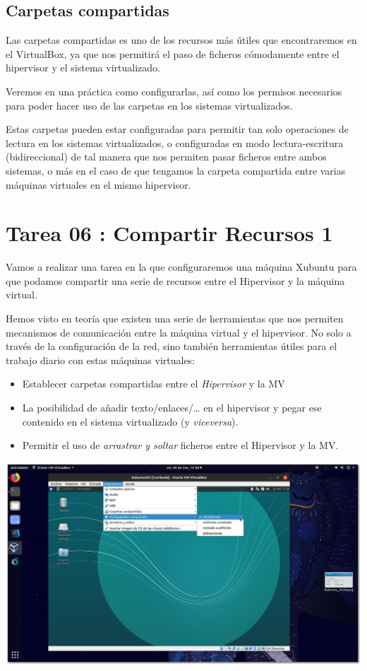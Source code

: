 \documentclass[11pt]{article}
\begin{document}
\subsection{Carpetas compartidas}
\label{sec:org675f63b}
Las carpetas compartidas es uno de los recursos más útiles que
encontraremos en el VirtualBox, ya que nos permitirá el paso de ficheros
cómodamente entre el hipervisor y el sistema virtualizado.

Veremos en una práctica como configurarlas, así como los permisos
necesarios para poder hacer uso de las carpetas en los sistemas
virtualizados.

Estas carpetas pueden estar configuradas para permitir tan solo
operaciones de lectura en los sistemas virtualizados, o configuradas en
modo lectura-escritura (bidireccional) de tal manera que nos permiten
pasar ficheros entre ambos sistemas, o más en el caso de que tengamos la
carpeta compartida entre varias máquinas virtuales en el mismo
hipervisor.


\newpage


\section{Tarea 06 : Compartir Recursos 1}
\label{sec:org173eb11}
Vamos a realizar una tarea en la que configuraremos una máquina Xubuntu
para que podamos compartir una serie de recursos entre el Hipervisor y
la máquina virtual.

Hemos visto en teoría que existen una serie de herramientas que nos
permiten mecanismos de comunicación entre la máquina virtual y el
hipervisor. No solo a través de la configuración de la red, sino también
herramientas útiles para el trabajo diario con estas máquinas virtuales:

\begin{itemize}
\item Establecer carpetas compartidas entre el \emph{Hipervisor} y la MV
\item La posibilidad de añadir texto/enlaces/\ldots{} en el hipervisor y pegar
ese contenido en el sistema virtualizado (y \emph{viceversa}).
\item Permitir el uso de \emph{arrastrar y soltar} ficheros entre el Hipervisor y
la MV.
\end{itemize}

\begin{center}
\includegraphics[width=.9\linewidth]{imgs/VBox_GuestAdd_LinuX_007.png}
\end{center}
\end{document}
